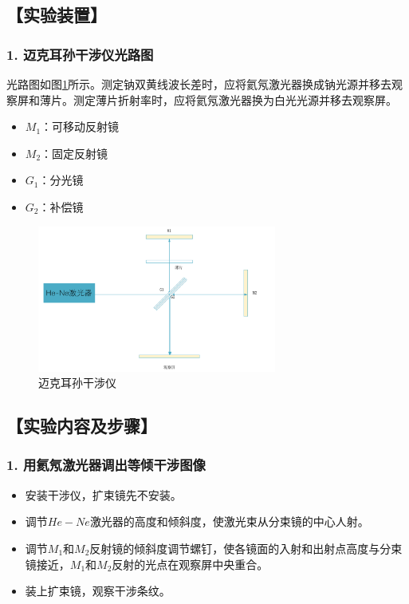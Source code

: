 \documentclass[12pt,a4paper,UTF8]{ctexart}
\begin{document}
\subsection*{【实验装置】}
	\subsubsection*{1. 迈克耳孙干涉仪光路图}
		光路图如图\ref{fig:illus-1}所示。测定钠双黄线波长差时，应将氦氖激光器换成钠光源并移去观察屏和薄片。测定薄片折射率时，应将氦氖激光器换为白光光源并移去观察屏。
		\begin{itemize}
			\item $M_1$：可移动反射镜
			\item $M_2$：固定反射镜
			\item $G_1$：分光镜
			\item $G_2$：补偿镜
		\end{itemize}
		\begin{figure}[htbp]
			\centering
			\includegraphics[width=0.7\textwidth]{attachments/illus-1.png}
			\caption{迈克耳孙干涉仪}
			\label{fig:illus-1}
		\end{figure}

		
		
\subsection*{【实验内容及步骤】}
	\subsubsection*{1. 用氦氖激光器调出等倾干涉图像}
		\begin{itemize}
			\item 安装干涉仪，扩束镜先不安装。
			\item 调节$ He-Ne $激光器的高度和倾斜度，使激光束从分束镜的中心人射。
			\item 调节$M_1$和$M_2$反射镜的倾斜度调节螺钉，使各镜面的入射和出射点高度与分束镜接近，$M_1$和$M_2$反射的光点在观察屏中央重合。
			\item 装上扩束镜，观察干涉条纹。
		\end{itemize}
\end{document}
